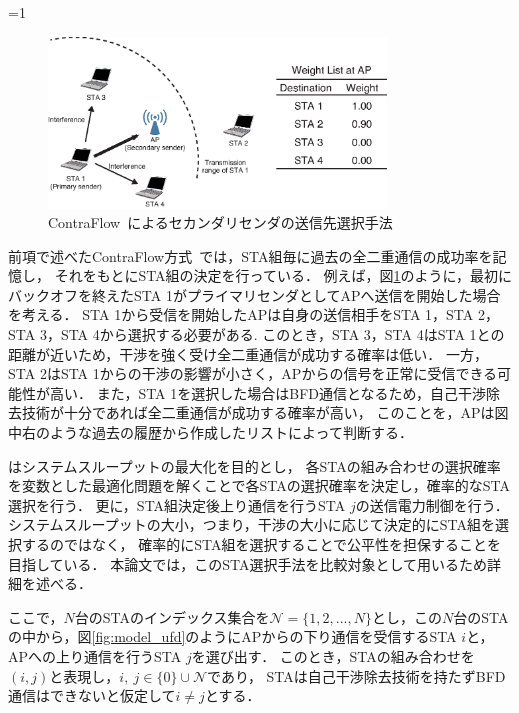 \documentclass[master]{kuisthesis}		%
\newcommand{\sij}{(i,j)}
\newcommand{\mN}{{\mathcal N}}
\newcounter{flagFig}
\begin{document}
			\par
			\ifnum\value{flagFig}=1 {\begin{figure}[htbp]
				\begin{center}
					\includegraphics[width=0.8\textwidth]{fig/contra.eps}
					\caption{ContraFlow~\cite{contra}によるセカンダリセンダの送信先選択手法}
					\label{fig:contra}
				\end{center}
			\end{figure}}\fi
			前項で述べたContraFlow方式~\cite{contra}では，STA組毎に過去の全二重通信の成功率を記憶し，
			それをもとにSTA組の決定を行っている．
			例えば，図\ref{fig:contra}のように，最初にバックオフを終えたSTA 1がプライマリセンダとしてAPへ送信を開始した場合を考える．
			STA 1から受信を開始したAPは自身の送信相手をSTA 1，STA 2，STA 3，STA 4から選択する必要がある.
			このとき，STA 3，STA 4はSTA 1との距離が近いため，干渉を強く受け全二重通信が成功する確率は低い．
			一方，STA 2はSTA 1からの干渉の影響が小さく，APからの信号を正常に受信できる可能性が高い．
			また，STA 1を選択した場合はBFD通信となるため，自己干渉除去技術が十分であれば全二重通信が成功する確率が高い，
			このことを，APは図中右のような過去の履歴から作成したリストによって判断する．
			\par
			\cite{promac}はシステムスループットの最大化を目的とし，
			各STAの組み合わせの選択確率を変数とした最適化問題を解くことで各STAの選択確率を決定し，確率的なSTA選択を行う．
			更に，STA組決定後上り通信を行うSTA $j$の送信電力制御を行う．
			システムスループットの大小，つまり，干渉の大小に応じて決定的にSTA組を選択するのではなく，
			確率的にSTA組を選択することで公平性を担保することを目指している．
			本論文では，このSTA選択手法を比較対象として用いるため詳細を述べる．
			\par
			ここで，$N$台のSTAのインデックス集合を$\mN=\{1,2,...,N\}$とし，この$N$台のSTAの中から，図\ref{fig:model_ufd}のようにAPからの下り通信を受信するSTA $i$と，APへの上り通信を行うSTA $j$を選び出す．
			このとき，STAの組み合わせを$\sij$と表現し，$i,\ j \in \{0\}\cup \mN$であり，
			STAは自己干渉除去技術を持たずBFD通信はできないと仮定して$i\neq j$とする．
\end{document}
